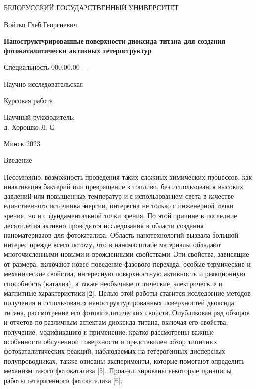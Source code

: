 \documentclass[oneside,final,12pt]{extreport}
\begin{document}

\centerline{БЕЛОРУССКИЙ  ГОСУДАРСТВЕННЫЙ УНИВЕРСИТЕТ}

\vfill
\vfill
\vfill
\large
\centerline{Войтко Глеб Георгиевич}
\vfill
\Large
\begin{center}
{\bf Наноструктурированные поверхности  диоксида титана для создания фотокаталитически активных гетероструктур}
\end{center}
\normalsize
\vfill
\centerline{Специальность 000.00.00 --- }
\centerline{Научно-исследовательская}
\vfill
\centerline{Курсовая работа}
\vfill
\vfill
\begin{flushright}
Научный руководитель:\\
д. Хорошко Л. С.
\end{flushright}
\vfill
\vfill
\centerline{Минск 2023}
\thispagestyle{empty}


\tableofcontents

\begin{chapter} {Введение}

Несомненно, возможность проведения таких сложных химических процессов, как инактивация бактерий или превращение  в топливо, без использования высоких давлений или повышенных температур и с использованием света в качестве единственного источника энергии, интересна не только с инженерной точки зрения, но и с фундаментальной точки зрения. По этой причине в последние десятилетия активно проводятся исследования в области создания наноматериалов для фотокатализа. Область нанотехнологий вызвала большой интерес прежде всего потому, что в наномасштабе материалы обладают многочисленными новыми и врожденными свойствами. Эти свойства, зависящие от размера, включают новое поведение фазового перехода, особые термические и механические свойства, интересную поверхностную активность и реакционную способность (катализ), а также необычные оптические, электрические и магнитные характеристики [2]. Целью этой работы ставится исследовние методов получения и использования наноструктурированных поверхностей диоксида титана, рассмотрение его фотокаталитических свойств. Опубликован ряд обзоров и отчетов по различным аспектам диоксида титана, включая его свойства, получение, модификацию и применение: кратко рассмотрены важные особенности облученной поверхности  и представилен обзор типичных фотокаталитических реакций, наблюдаемых на гетерогенных дисперсных полупроводниках, также описаны эксперименты, которые помогают определить механизм такого фотокатализа [5]. Проанализированы некоторые принципы работы гетерогенного фотокатализа  [6].

\end{chapter}
	
\end{document}
